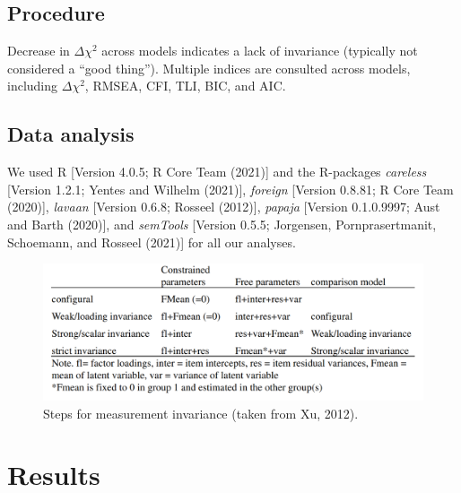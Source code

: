 \documentclass[
  english,
  man]{apa6}
\begin{document}
\hypertarget{procedure}{%
\subsection{Procedure}\label{procedure}}

Decrease in \(\Delta\chi^2\) across models indicates a lack of invariance (typically not considered a ``good thing''). Multiple indices are consulted across models, including \(\Delta\chi^2\), RMSEA, CFI, TLI, BIC, and AIC.

\hypertarget{data-analysis}{%
\subsection{Data analysis}\label{data-analysis}}

We used R {[}Version 4.0.5; R Core Team (2021){]} and the R-packages \emph{careless} {[}Version 1.2.1; Yentes and Wilhelm (2021){]}, \emph{foreign} {[}Version 0.8.81; R Core Team (2020){]}, \emph{lavaan} {[}Version 0.6.8; Rosseel (2012){]}, \emph{papaja} {[}Version 0.1.0.9997; Aust and Barth (2020){]}, and \emph{semTools} {[}Version 0.5.5; Jorgensen, Pornprasertmanit, Schoemann, and Rosseel (2021){]} for all our analyses.

\begin{figure}
\includegraphics[width=4.71in]{steps} \caption{Steps for measurement invariance (taken from Xu, 2012).}\label{fig:figure1}
\end{figure}

\hypertarget{results}{%
\section{Results}\label{results}}
\end{document}
